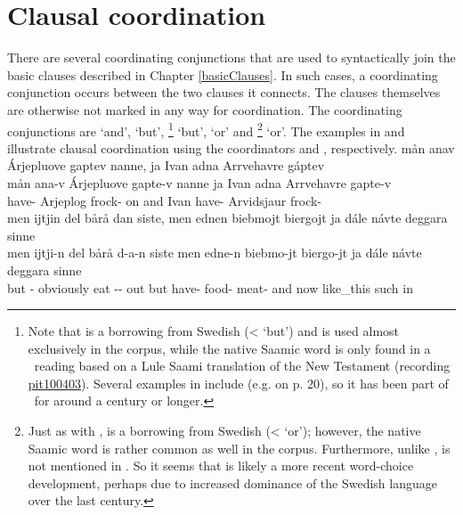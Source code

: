 \section{Clausal coordination}\label{clausalCoordination}
There are several coordinating conjunctions that are used to syntactically join the basic clauses described in Chapter \ref{basicClauses}. In such cases, a coordinating conjunction occurs between the two clauses it connects. The clauses themselves are otherwise not marked in any way for coordination. The coordinating conjunctions are  ‘and’,  ‘but’, \footnote{Note that  is a borrowing from Swedish (<  ‘but’) and is used almost exclusively in the corpus, while the native Saamic word  is only found in a \PS\ reading based on a Lule Saami translation of the New Testament (recording \hyperlink{pit100403}{pit100403}). Several examples in \citet{Lagercrantz1926} include  (e.g. on p. 20), so it has been part of \PS\ for around a century or longer.} 
‘but’,  ‘or’ and \footnote{Just as with ,  is a borrowing from Swedish (<  ‘or’); however, the native Saamic word  is rather common as well in the corpus. Furthermore, unlike ,  is not mentioned in \citet{Lagercrantz1926}. So it seems that  is likely a more recent word-choice development, perhaps due to increased dominance of the Swedish language over the last century.} 
‘or’. The examples in  and  illustrate clausal coordination using the coordinators  and , respectively.
\ea\label{coordination1}
\glll	mån anav Árjepluove gaptev nanne, ja Ivan adna Arrvehavre gáptev\\
	mån ana-v Árjepluove gapte-v nanne ja Ivan adna Arrvehavre gapte-v\\
	 have- Arjeplog\BS{} frock- on and Ivan have- Arvidsjaur\BS{} frock-\\\nopagebreak
{} 
\z
\ea\label{coordination2}
\glll	men ijtjin del bårå dan siste, men ednen biebmojt biergojt ja dále návte deggara sinne\\
	men ijtji-n del bårå d-a-n siste men edne-n biebmo-jt biergo-jt ja dále návte deggara sinne\\
	but - obviously eat\BS{} -- out but have- food- meat- and now like\_this such\BS{} in\\\nopagebreak
{} 
\z

